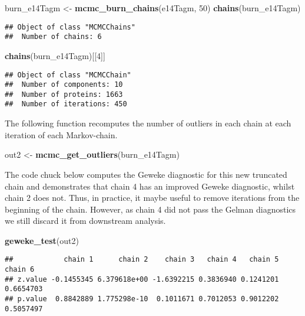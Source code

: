 \documentclass[9pt,a4paper,]{extarticle}
\newenvironment{Shaded}{\begin{snugshade}}{\end{snugshade}}
\newcommand{\DecValTok}[1]{\textcolor[rgb]{0.00,0.00,0.81}{#1}}
\newcommand{\KeywordTok}[1]{\textcolor[rgb]{0.13,0.29,0.53}{\textbf{#1}}}
\newcommand{\NormalTok}[1]{#1}
\newcommand{\StringTok}[1]{\textcolor[rgb]{0.31,0.60,0.02}{#1}}
\begin{document}
\begin{Shaded}
\begin{Highlighting}[]
\NormalTok{burn_e14Tagm <-}\StringTok{ }\KeywordTok{mcmc_burn_chains}\NormalTok{(e14Tagm, }\DecValTok{50}\NormalTok{)}
\KeywordTok{chains}\NormalTok{(burn_e14Tagm)}
\end{Highlighting}
\end{Shaded}

\begin{verbatim}
## Object of class "MCMCChains"
##  Number of chains: 6
\end{verbatim}

\begin{Shaded}
\begin{Highlighting}[]
\KeywordTok{chains}\NormalTok{(burn_e14Tagm)[[}\DecValTok{4}\NormalTok{]]}
\end{Highlighting}
\end{Shaded}

\begin{verbatim}
## Object of class "MCMCChain"
##  Number of components: 10 
##  Number of proteins: 1663 
##  Number of iterations: 450
\end{verbatim}

The following function recomputes the number of outliers in each chain
at each iteration of each Markov-chain.

\begin{Shaded}
\begin{Highlighting}[]
\NormalTok{out2 <-}\StringTok{ }\KeywordTok{mcmc_get_outliers}\NormalTok{(burn_e14Tagm)}
\end{Highlighting}
\end{Shaded}

The code chuck below computes the Geweke diagnostic for this new
truncated chain and demonstrates that chain 4 has an improved Geweke
diagnostic, whilst chain 2 does not. Thus, in practice, it maybe
useful to remove iterations from the beginning of the chain. However,
as chain 4 did not pass the Gelman diagnostics we still discard it
from downstream analysis.

\begin{Shaded}
\begin{Highlighting}[]
\KeywordTok{geweke_test}\NormalTok{(out2)}
\end{Highlighting}
\end{Shaded}

\begin{verbatim}
##            chain 1      chain 2    chain 3   chain 4   chain 5   chain 6
## z.value -0.1455345 6.379618e+00 -1.6392215 0.3836940 0.1241201 0.6654703
## p.value  0.8842889 1.775298e-10  0.1011671 0.7012053 0.9012202 0.5057497
\end{verbatim}
\end{document}
